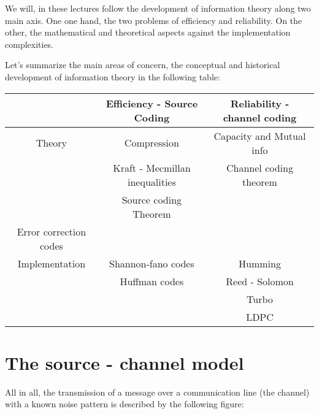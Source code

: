 We will, in these lectures follow the development of information theory along two main axis. One one hand, the two problems of efficiency and reliability. On the other, the mathematical and theoretical aspects against the implementation complexities.

Let's summarize the main areas of concern, the conceptual and historical development of information theory in the following table:

\begin{center}
	\begin{tabular}{  c | c | c }
		 		& Efficiency - Source Coding & Reliability - channel coding \\
		 		\hline
		Theory & Compression & Capacity and Mutual info \\
		 	   & Kraft - Mecmillan  inequalities & Channel  coding theorem \\
 	           & Source coding Theorem & \\ Error correction codes \\
 	           \hline
		Implementation & Shannon-fano codes & Humming \\
		               & Huffman codes & Reed - Solomon \\
		               &  & Turbo \\
		               &  & LDPC \\
\end{tabular}
\end{center}

\section*{The source - channel model}

All in all, the transmission of a message over a communication line (the channel) with a known noise pattern is described by the following figure:

